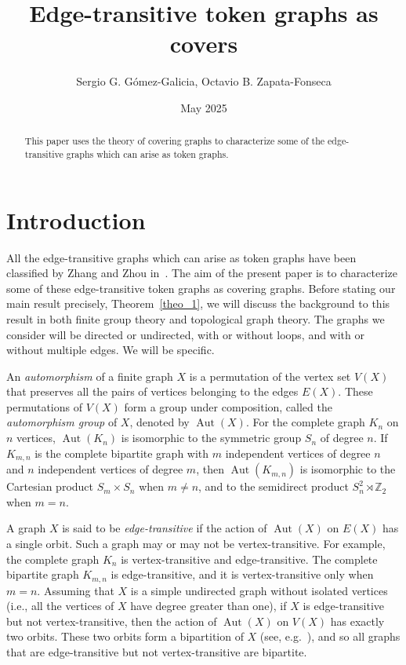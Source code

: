 \documentclass[letterpaper,10pt]{article}
\title{Edge-transitive token graphs as covers}
\author{Sergio G. G\'omez-Galicia, Octavio B. Zapata-Fonseca}
\date{May 2025}
\theoremstyle{plain}
\theoremstyle{definition}
\DeclareMathOperator{\Aut}{Aut}
\begin{document}
\maketitle

\begin{abstract}

This paper uses the theory of covering graphs  to characterize  some of the  edge-transitive graphs which can arise as token graphs. 

\end{abstract}

\section{Introduction}
\label{sec:intro}

All the edge-transitive graphs which can arise as token graphs 
have been classified by Zhang and Zhou in~\cite{ZZ}. 
The aim of the present paper is to characterize some of these edge-transitive token graphs as covering graphs. 
Before stating our main result precisely, Theorem~\ref{theo_1}, we will discuss the background to this result in both finite group theory and topological graph theory.
The graphs we consider will be directed or undirected, with or without loops, and with or without multiple edges. 
We will be specific. 

An \emph{automorphism} of a finite graph $X$ is a permutation of the vertex set $V(X)$ that preserves all the pairs of vertices belonging to the edges $E(X)$. 
These permutations of $V(X)$ form a group under composition, called the \emph{automorphism group} of $X$,  denoted by $\Aut(X)$. 
For the complete graph $K_n$ on $n$ vertices,  
$\Aut(K_n)$ is isomorphic to the symmetric group $S_n$ of degree $n$.  
If $K_{m,n}$ is the complete bipartite graph with $m$ independent vertices of degree $n$ and $n$ independent vertices of degree $m$,  then $\Aut(K_{m,n})$ is isomorphic to the Cartesian product $S_m \times S_n$ when $m\neq n$, and to the semidirect product $S_n^2 \rtimes \mathbb{Z}_2$ when $m = n$. 

A graph $X$ is said to be \emph{edge-transitive} if the action of $\Aut(X)$ on $E(X)$ has a single orbit. 
Such a graph may or may not be vertex-transitive. For example, the complete graph $K_n$ is vertex-transitive and edge-transitive. 
The complete bipartite graph $K_{m,n}$ is edge-transitive, and it is vertex-transitive only when $m=n$. 
Assuming that $X$ is a simple undirected graph without isolated vertices (i.e., all the vertices of $X$ have degree greater than one),  if $X$ is edge-transitive but not vertex-transitive, then the action of $\Aut(X)$ on $V(X)$ has exactly two orbits. 
These two orbits form a bipartition of $X$ (see, e.g.~\cite[Lemma 3.2.1]{AGT}), and so all graphs that are edge-transitive but not vertex-transitive are bipartite.
\end{document}
